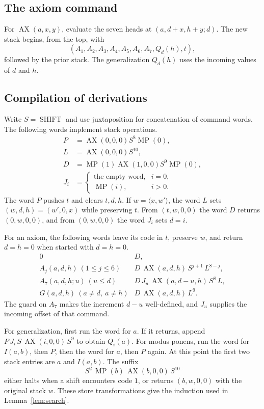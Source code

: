 \documentclass[11pt,letterpaper]{article}
\newcommand{\pair}[2]{\langle #1,#2\rangle}
\DeclareMathOperator{\AX}{AX}
\DeclareMathOperator{\MP}{MP}
\DeclareMathOperator{\SHIFT}{SHIFT}
\begin{document}
\subsection{The axiom command}

For $\AX(a,x,y)$, evaluate the seven heads at $(a,d+x,h+y;d)$.
The new stack begins, from the top, with
\[
  (A_1,A_2,A_3,A_4,A_5,A_6,A_7,Q_d(h),t),
\]
followed by the prior stack. The generalization $Q_d(h)$ uses the
incoming values of $d$ and $h$.

\subsection{Compilation of derivations}\label{app:compiler}

Write $S=\SHIFT$ and use juxtaposition for concatenation of
command words. The following words implement stack operations.
\begin{align*}
 P &= \AX(0,0,0) S^8\MP(0),\\
 L &= \AX(0,0,0) S^{10},\\
 D &= \MP(1)\AX(1,0,0)S^9\MP(0),\\
 J_i &= \begin{cases}
   \text{the empty word}, & i=0,\\
   \MP(i), & i>0.
 \end{cases}
\end{align*}
The word $P$ pushes $t$ and clears $t,d,h$. If
$w=\pair{x}{w'}$, the word $L$ sets $(w,d,h)=(w',0,x)$
while preserving $t$. From $(t,w,0,0)$ the word $D$ returns
$(0,w,0,0)$, and from $(0,w,0,0)$ the word $J_i$ sets $d=i$.

For an axiom, the following words leave its code in $t$, preserve
$w$, and return $d=h=0$ when started with $d=h=0$.
\[
\begin{array}{ll}
 0 & D,\\
 A_j(a,d,h)\ (1\le j\le 6) & D\,\AX(a,d,h)\,S^{j+1}\,L^{8-j},\\
 A_7(a,d,h;u)\ (u\le d) & D\,J_u\,\AX(a,d-u,h)\,S^8\,L,\\
 G(a,d,h)\ (a\ne d,\ a\ne h) & D\,\AX(a,d,h)\,L^9 .
\end{array}
\]
The guard on $A_7$ makes the increment $d-u$ well-defined, and
$J_u$ supplies the incoming offset of that command.

For generalization, first run the word for $a$. If it returns,
append $P\,J_i\,S\,\AX(i,0,0)\,S^9$ to obtain $Q_i(a)$.
For modus ponens, run the word for $I(a,b)$, then $P$, then
the word for $a$, then $P$ again. At this point the first two
stack entries are $a$ and $I(a,b)$. The suffix
\[
  S^2\,\MP(b)\,\AX(b,0,0)\,S^{10}
\]
either halts when a shift encounters code $1$, or returns
$(b,w,0,0)$ with the original stack $w$. These store
transformations give the induction used in Lemma~\ref{lem:search}.
\end{document}
